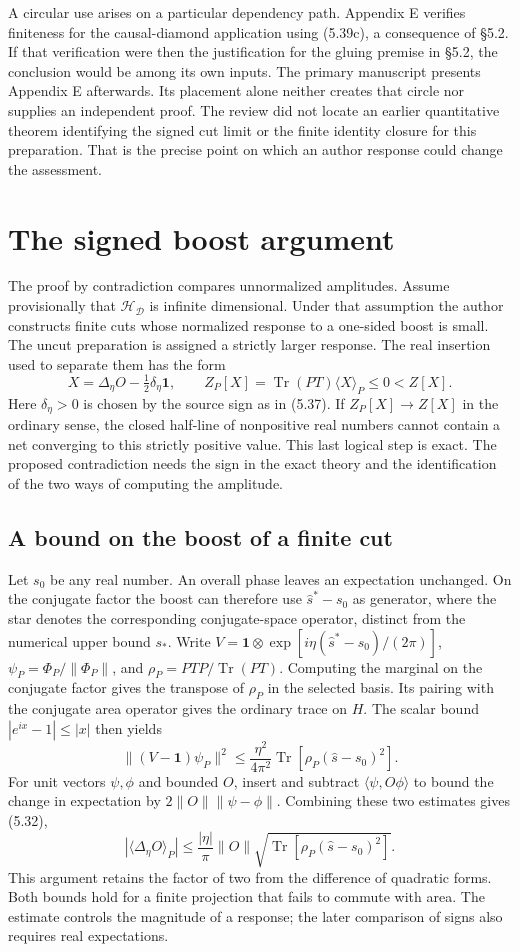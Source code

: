 \documentclass[11pt]{article}
\newcommand{\Tr}{\operatorname{Tr}}
\newcommand{\id}{\mathbf{1}}
\newcommand{\HH}{\mathcal H_{\mathcal D}}
\newcommand{\areaop}{\hat s}
\newcommand{\parttitle}[2]{\clearpage\section{#1}\markboth{#2}{#2}}
\begin{document}
A circular use arises on a particular dependency path. Appendix E verifies finiteness for the causal-diamond application using (5.39c), a consequence of \S5.2. If that verification were then the justification for the gluing premise in \S5.2, the conclusion would be among its own inputs. The primary manuscript presents Appendix E afterwards. Its placement alone neither creates that circle nor supplies an independent proof. The review did not locate an earlier quantitative theorem identifying the signed cut limit or the finite identity closure for this preparation. That is the precise point on which an author response could change the assessment.

\parttitle{The signed boost argument}{The signed boost argument}
The proof by contradiction compares unnormalized amplitudes. Assume provisionally that $\HH$ is infinite dimensional. Under that assumption the author constructs finite cuts whose normalized response to a one-sided boost is small. The uncut preparation is assigned a strictly larger response. The real insertion used to separate them has the form
\begin{equation}\label{eq:signed}
 X=\Delta_\eta O-\tfrac12\delta_\eta\id,\qquad
 Z_P[X]=\Tr(PT)\langle X\rangle_P\le0<Z[X].
\end{equation}
Here $\delta_\eta>0$ is chosen by the source sign as in (5.37). If $Z_P[X]\to Z[X]$ in the ordinary sense, the closed half-line of nonpositive real numbers cannot contain a net converging to this strictly positive value. This last logical step is exact. The proposed contradiction needs the sign in the exact theory and the identification of the two ways of computing the amplitude.

\subsection{A bound on the boost of a finite cut}
Let $s_0$ be any real number. An overall phase leaves an expectation unchanged. On the conjugate factor the boost can therefore use $\areaop^*-s_0$ as generator, where the star denotes the corresponding conjugate-space operator, distinct from the numerical upper bound $s_*$. Write $V=\id\otimes\exp[i\eta(\areaop^*-s_0)/(2\pi)]$, $\psi_P=\Phi_P/\|\Phi_P\|$, and $\rho_P=PTP/\Tr(PT)$. Computing the marginal on the conjugate factor gives the transpose of $\rho_P$ in the selected basis. Its pairing with the conjugate area operator gives the ordinary trace on $H$. The scalar bound $|e^{ix}-1|\le|x|$ then yields
\[
 \|(V-\id)\psi_P\|^2
 \le \frac{\eta^2}{4\pi^2}\Tr[\rho_P(\areaop-s_0)^2].
\]
For unit vectors $\psi,\phi$ and bounded $O$, insert and subtract $\langle\psi,O\phi\rangle$ to bound the change in expectation by $2\|O\|\|\psi-\phi\|$. Combining these two estimates gives (5.32),
\[
 |\langle\Delta_\eta O\rangle_P|
 \le \frac{|\eta|}{\pi}\|O\|\sqrt{\Tr[\rho_P(\areaop-s_0)^2]} .
\]
This argument retains the factor of two from the difference of quadratic forms. Both bounds hold for a finite projection that fails to commute with area. The estimate controls the magnitude of a response; the later comparison of signs also requires real expectations.
\end{document}
